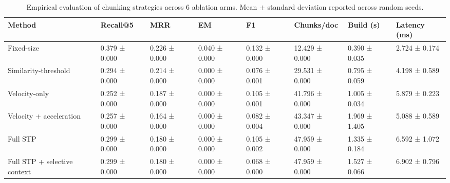 \begin{table}[t]
\centering
\caption{Empirical evaluation of chunking strategies across 6 ablation arms. Mean $\pm$ standard deviation reported across random seeds.}
\label{tab:results}
\begin{tabularx}{\textwidth}{lXXXXXXX}
\toprule
\textbf{Method} & \textbf{Recall@5} & \textbf{MRR} & \textbf{EM} & \textbf{F1} & \textbf{Chunks/doc} & \textbf{Build (s)} & \textbf{Latency (ms)} \\
\midrule
Fixed-size & 0.379 ± 0.000 & 0.226 ± 0.000 & 0.040 ± 0.000 & 0.132 ± 0.000 & 12.429 ± 0.000 & 0.390 ± 0.035 & 2.724 ± 0.174 \\
Similarity-threshold & 0.294 ± 0.000 & 0.214 ± 0.000 & 0.000 ± 0.000 & 0.076 ± 0.001 & 29.531 ± 0.000 & 0.795 ± 0.059 & 4.198 ± 0.589 \\
Velocity-only & 0.252 ± 0.000 & 0.187 ± 0.000 & 0.000 ± 0.000 & 0.105 ± 0.001 & 41.796 ± 0.000 & 1.005 ± 0.034 & 5.879 ± 0.223 \\
Velocity + acceleration & 0.257 ± 0.000 & 0.164 ± 0.000 & 0.000 ± 0.000 & 0.082 ± 0.004 & 43.347 ± 0.000 & 1.969 ± 1.405 & 5.088 ± 0.589 \\
Full STP & 0.299 ± 0.000 & 0.180 ± 0.000 & 0.000 ± 0.000 & 0.105 ± 0.002 & 47.959 ± 0.000 & 1.335 ± 0.184 & 6.592 ± 1.072 \\
Full STP + selective context & 0.299 ± 0.000 & 0.180 ± 0.000 & 0.000 ± 0.000 & 0.068 ± 0.000 & 47.959 ± 0.000 & 1.527 ± 0.066 & 6.902 ± 0.796 \\
\bottomrule
\end{tabularx}
\end{table}